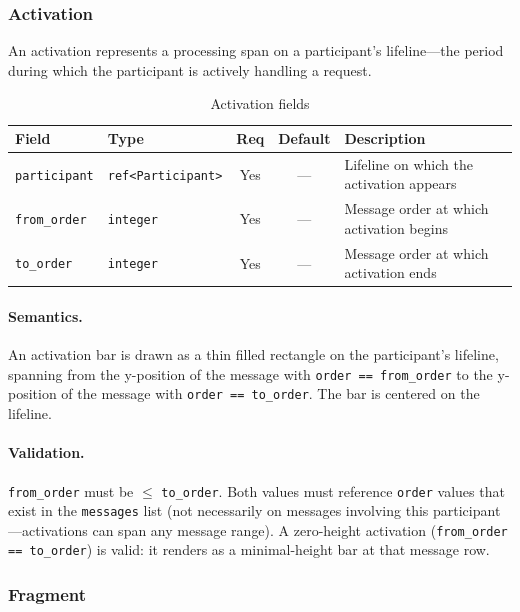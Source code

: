 \subsubsection{Activation}
\label{sec:seq-activation}

An activation represents a processing span on a participant's lifeline---the period during which the participant is actively handling a request.

\begin{table}[h]
\centering
\small
\begin{tabular}{llccp{4.5cm}}
\toprule
\textbf{Field} & \textbf{Type} & \textbf{Req} & \textbf{Default} & \textbf{Description} \\
\midrule
\texttt{participant} & \texttt{ref<Participant>} & Yes & --- & Lifeline on which the activation appears \\
\texttt{from\_order} & \texttt{integer} & Yes & --- & Message order at which activation begins \\
\texttt{to\_order} & \texttt{integer} & Yes & --- & Message order at which activation ends \\
\bottomrule
\end{tabular}
\caption{Activation fields}
\label{tab:seq-activation-fields}
\end{table}

\paragraph{Semantics.}
An activation bar is drawn as a thin filled rectangle on the participant's lifeline, spanning from the y-position of the message with \texttt{order == from\_order} to the y-position of the message with \texttt{order == to\_order}. The bar is centered on the lifeline.

\paragraph{Validation.}
\texttt{from\_order} must be $\le$ \texttt{to\_order}. Both values must reference \texttt{order} values that exist in the \texttt{messages} list (not necessarily on messages involving this participant---activations can span any message range). A zero-height activation (\texttt{from\_order == to\_order}) is valid: it renders as a minimal-height bar at that message row.

\subsubsection{Fragment}
\label{sec:seq-fragment}

